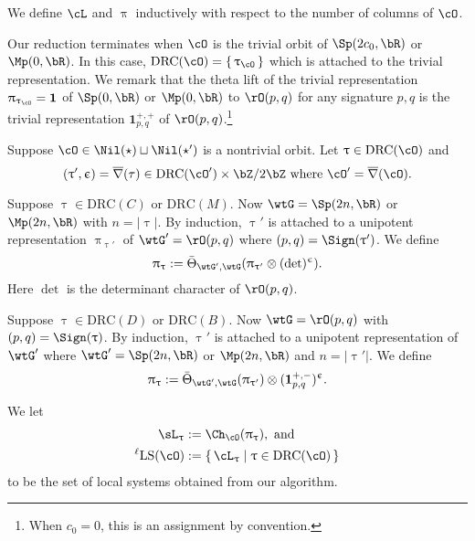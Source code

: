 \documentclass[12pt,a4paper]{amsart}
\newcommand{\bfone}{\mathbf{1}}
\def\abs#1{\left|{#1}\right|}
\def\eDD{\overline{\nabla}}
\numberwithin{equation}{section}
\theoremstyle{remark}
\def\Thetab{\bar{\Theta}}
\def\drc{\mathrm{DRC}}
\def\LLS{\mathrm{{}^{\ell} LS}}
\def\lUnip{\mathrm{{}^{\ell}Unip}}
\begin{document}
We define $\cL$ and $\uppi$ inductively with respect to the number of
columns of $\cO$.
\begin{enumS}
  \item %
  Our reduction terminates when $\cO$ is the trivial orbit of $\Sp(2c_{0},\bR)$ or
  $\Mp(0,\bR)$.
  In this case,
  $\drc(\cO) = \set{\uptau_{\cO}}$ which is attached to the trivial
  representation.
  We remark that the theta lift of the trivial representation
  $\uppi_{\uptau_{\cO}}=\bfone$ of $\Sp(0,\bR)$ or $\Mp(0,\bR)$ to $\rO(p,q)$ for
  any signature $p,q$ is the trivial representation $\bfone_{p,q}^{+,+}$ of
  $\rO(p,q)$.\footnote{When $c_{0}=0$, this is an assignment by convention.}
  \item Suppose $\cO\in \Nil(\star)\sqcup \Nil(\star')$ is a nontrivial orbit.
  Let $\uptau \in \drc(\cO)$ and
  \[
    (\uptau', \upepsilon) = \eDD(\tau)\in \drc(\cO')\times \bZ/2\bZ \text{ where }\cO' = \eDD(\cO).
  \]
  \begin{enumS}
    \item Suppose $\uptau\in \drc(C)$ or $\drc(M)$. Now $\wtG = \Sp(2n,\bR)$ or
    $\Mp(2n,\bR)$ with $n=\abs{\uptau}$. By induction, $\uptau'$ is attached to
    a unipotent representation $\uppi_{\uptau'}$ of $\wtG' = \rO(p,q)$ where
    $(p,q)=\Sign(\uptau')$. We define
    \[
      \uppi_{\uptau} := \Thetab_{\wtG',\wtG}(\uppi_{\uptau'}\otimes (\det)^{\upepsilon}).
    \]
    Here $\det$ is the determinant character of $\rO(p,q)$.
    \item Suppose $\uptau\in \drc(D)$ or $\drc(B)$. Now $\wtG = \rO(p,q)$ with
    $(p,q) = \Sign(\uptau)$. By induction, $\uptau'$ is attached to a
    unipotent representation of $\wtG'$ where $\wtG' = \Sp(2n,\bR)$ or
    $\Mp(2n,\bR)$ and $n=\abs{\uptau'}$. We define
    \[
      \uppi_{\uptau} := \Thetab_{\wtG',\wtG}(\uppi_{\uptau'})\otimes (\bfone_{p,q}^{+,-})^{\upepsilon}.
    \]
  \end{enumS}
\end{enumS}

We let
\[
  \begin{split}
    \sL_{\uptau} & := \Ch_{\cO}(\uppi_{\uptau}), \text{ and } \\
    \LLS(\cO) & := \set{\cL_{\uptau}|\uptau \in \drc(\cO)}
  \end{split}
\]
to be the set of local systems obtained from our algorithm.
\end{document}
